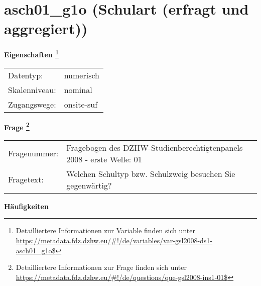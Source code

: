 
    \setcounter{footnote}{0}

    \vspace*{-1.8cm}
	\section{asch01\_g1o (Schulart (erfragt und aggregiert))}
	\label{section:asch01_g1o}



    \vspace*{0.5cm}
    \noindent\textbf{Eigenschaften
	\footnote{Detailliertere Informationen zur Variable finden sich unter
		\url{https://metadata.fdz.dzhw.eu/\#!/de/variables/var-gsl2008-ds1-asch01_g1o$}}}\\
	\begin{tabularx}{\hsize}{@{}lX}
	Datentyp: & numerisch \\
	Skalenniveau: & nominal \\
	Zugangswege: &
	  onsite-suf
 \\
    \end{tabularx}



				\vspace*{0.5cm}
                \noindent\textbf{Frage
	                \footnote{Detailliertere Informationen zur Frage finden sich unter
		              \url{https://metadata.fdz.dzhw.eu/\#!/de/questions/que-gsl2008-ins1-01$}}}\\
				\begin{tabularx}{\hsize}{@{}lX}
					Fragenummer: &
					  Fragebogen des DZHW-Studienberechtigtenpanels 2008 - erste Welle:
					  01
 \\
					Fragetext: & Welchen Schultyp bzw. Schulzweig besuchen Sie gegenwärtig? \\
				\end{tabularx}





        		\vspace*{0.5cm}
                \noindent\textbf{Häufigkeiten}

